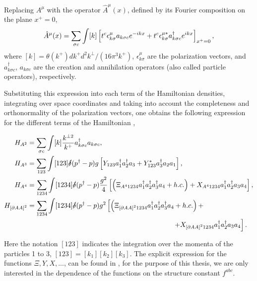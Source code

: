 \documentclass[11pt,a4paper,twoside,pdf]{article}
\numberwithin{equation}{section}
\begin{document}
Replacing $A^\mu$ with the operator $\hat{A}^\mu(x)$, defined by its Fourier composition
on the plane $x^+=0$,
\begin{equation}
    \hat{A}^\mu(x) = \sum _{\sigma c} \int [k] \left[ t^c \epsilon^\mu_{k \sigma} 
    a_{k\sigma c}  e^{-ikx} + t^c \epsilon^{\mu*}_{k \sigma} 
    a^\dagger_{k\sigma c}  e^{ikx} \right]_{x^+=0},
\end{equation}
where $[k] = \theta(k^+) dk^+ d^2k^\perp / (16\pi^3k^+)$, $\epsilon^\mu_{k \sigma}$ 
are the polarization vectors, and $a^\dagger_{k\sigma c}$, $a_{k\sigma c}$ are the 
creation and annihilation operators (also called particle operators), respectively. 


Substituting this expression into each term of the Hamiltonian densities, integrating
over space coordinates and taking into account the completeness and orthonormality 
of the polarization vectors, one obtains the following expression for the different
terms of the Hamiltonian \cite{QCDG}, 

\begin{align}
    H_{A^2} &= \sum_{\sigma c} \int [k] \frac{k^{\perp 2}}{k^+}a^\dagger_{k\sigma c}
    a_{k\sigma c}, \label{eq:H_A^2}\\
    H_{A^3} &= \sum_{123} \int [123] \slashed{\delta}(p^\dagger - p) 
    g\sbrackets{Y_{123}a_1^\dagger a_2^\dagger a_3 + Y_{123}^*a_3^\dagger a_2 a_1},
    \label{eq:H_A^3}\\
    H_{A^4} &= \sum_{1234} \int [1234] \slashed{\delta}(p^\dagger - p) \frac{g^2}{4}
    \sbrackets{\parenthesis{\Xi_{A^4 1234} a_1^\dagger a_2^\dagger a_3^\dagger a_4 + h.c.}+ X_{A^4 1234} 
    a_1^\dagger a_2^\dagger a_3 a_4 }, \label{eq:H_A^4}\\
    H_{\sbrackets{\partial A A}^2} &= \sum_{1234} \int [1234] \slashed{\delta}
    (p^\dagger - p) g^2 \left[\parenthesis{\Xi_{\sbrackets{\partial A A}^2 1234}
    a_1^\dagger a_2^\dagger a_3^\dagger a_4 + h.c.}+\right.\nonumber \\
    &\left. \hspace{7.5cm} + X_{\sbrackets{\partial A A}^2 
    1234} a_1^\dagger a_2^\dagger a_3 a_4 \right] \label{eq:H_partial}.
\end{align}

Here the notation $[123]$ indicates the integration over the momenta of
the particles 1 to 3, $[123] = [k_1][k_2][k_3]$. The explicit expression for the 
functions $\Xi, Y, X, ...$, can be found in \cite{QCDG}, for 
the purpose of this thesis, we are only interested in the dependence of the functions 
on the structure constant $f^{abc}$. 
\end{document}
